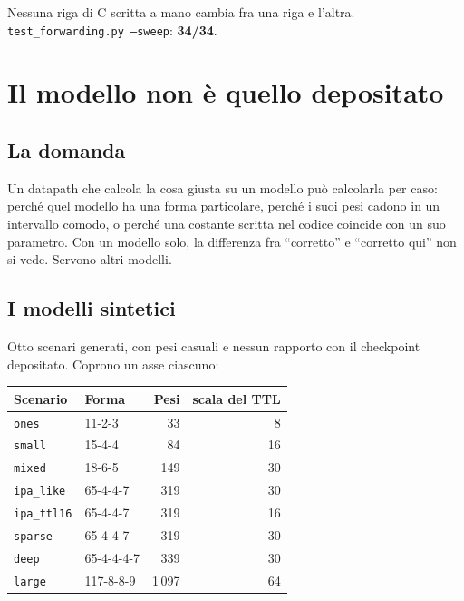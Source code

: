 \documentclass[11pt,a4paper,oneside]{report}
\begin{document}
Nessuna riga di C scritta a mano cambia fra una riga e l'altra.
\texttt{test\_forwarding.py --sweep}: \textbf{34/34}.

\chapter{Il modello non è quello depositato}

\section{La domanda}

Un datapath che calcola la cosa giusta su un modello può calcolarla per caso:
perché quel modello ha una forma particolare, perché i suoi pesi cadono in un
intervallo comodo, o perché una costante scritta nel codice coincide con un suo
parametro. Con un modello solo, la differenza fra ``corretto'' e ``corretto
qui'' non si vede. Servono altri modelli.

\section{I modelli sintetici}

Otto scenari generati, con pesi casuali e nessun rapporto con il checkpoint
depositato. Coprono un asse ciascuno:

\begin{center}
\small
\begin{tabular}{@{}llrr@{}}
\toprule
\textbf{Scenario} & \textbf{Forma} & \textbf{Pesi} & \textbf{scala del TTL} \\
\midrule
\texttt{ones}      & 11-2-3       &    33 & 8 \\
\texttt{small}     & 15-4-4       &    84 & 16 \\
\texttt{mixed}     & 18-6-5       &   149 & 30 \\
\texttt{ipa\_like} & 65-4-4-7     &   319 & 30 \\
\texttt{ipa\_ttl16}& 65-4-4-7     &   319 & 16 \\
\texttt{sparse}    & 65-4-4-7     &   319 & 30 \\
\texttt{deep}      & 65-4-4-4-7   &   339 & 30 \\
\texttt{large}     & 117-8-8-9    & 1\,097 & 64 \\
\bottomrule
\end{tabular}
\end{center}
\end{document}
